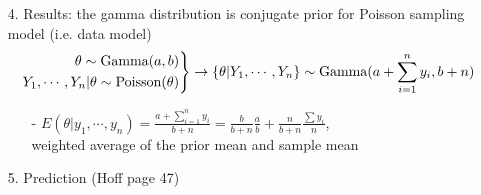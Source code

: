 \documentclass[11pt]{article}
\newenvironment{rcases}
  {\left.\begin{aligned}}
  {\end{aligned}\right\rbrace}
\begin{document}
\begin{enumerate}
\item[4.] Results: the gamma distribution is conjugate prior for Poisson sampling model (i.e. data model)\\
\begin{equation*}
\begin{rcases}
  \theta \sim \textrm{Gamma}(a, b) \\
  Y_1, \cdots, Y_n|\theta \sim \textrm{Poisson}(\theta)
\end{rcases}
\rightarrow \{\theta|Y_1, \cdots, Y_n\} \sim \textrm{Gamma}(a+\sum_{i=1}^{n}y_i, b+n)
\end{equation*}
\begin{itemize}
\item[-] $E(\theta|y_1, \cdots, y_n) = \frac{a+\sum_{i=1}^{n}y_i}{b+n} = \frac{b}{b+n}\frac{a}{b} + \frac{n}{b+n}\frac{\sum y_i}{n}$,\\ weighted average of the prior mean and sample mean
\end{itemize}
\vspace{3mm}
\item[5.] Prediction (Hoff page 47)
\end{enumerate}
\end{document}
